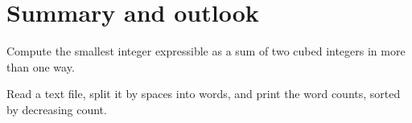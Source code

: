 
\chapter{Summary and outlook}

Compute the smallest integer expressible as a sum of two cubed integers
in more than one way.

Read a text file, split it by spaces into words, and print the word
counts, sorted by decreasing count.
